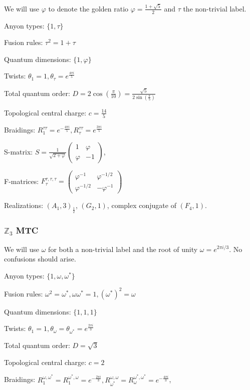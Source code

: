 \documentclass[12pt,psamsfonts]{amsart}
\newcommand{\Z}{\mathbb Z}
\numberwithin{equation}{section}
\theoremstyle{definition}
\begin{document}
We will use $\varphi$ to denote the golden ratio
$\varphi=\frac{1+\sqrt{5}}{2}$ and $\tau$ the non-trivial label.

Anyon types: $\{1,\tau\}$

Fusion rules: $\tau^2=1+\tau$

Quantum dimensions: $\{1,\varphi\}$

Twists: $\theta_1=1, \theta_{\tau}=e^{\frac{4\pi i}{5}}$

Total quantum order:
$D=2\cos(\frac{\pi}{10})=\frac{\sqrt{5}}{2\sin(\frac{\pi}{5})}$

Topological central charge: $c=\frac{14}{5}$

Braidings: $R_1^{\tau \tau}=e^{-\frac{4\pi i}{5}},
R_{\tau}^{\tau\tau}=e^{\frac{3\pi i}{5}}$

S-matrix: $ S=\frac{1}{\sqrt{2+\varphi}} \begin{pmatrix} 1 & \varphi \\
\varphi & -1
\end{pmatrix}$,

F-matrices:  $ F^{\tau,\tau,\tau}_{\tau}=\begin{pmatrix} \varphi^{-1} & {\varphi}^{-1/2} \\
{\varphi}^{-1/2} & -\varphi^{-1}
\end{pmatrix}$

Realizations: $(A_1,3)_{\frac{1}{2}}$, $(G_2,1)$, complex conjugate of $(F_4,1)$.

\subsubsection{$\Z_3$ MTC}  We will use $\omega$ for both a non-trivial label and the
root of unity $\omega=e^{2\pi i/3}$.  No confusions should arise.

Anyon types: $\{1,\omega,\omega^{*}\}$

Fusion rules:
$\omega^2=\omega^*,\omega\omega^*=1,(\omega^*)^2=\omega$

Quantum dimensions: $\{1,1,1\}$

Twists: $\theta_1=1,
\theta_{\omega}=\theta_{\omega^*}=e^{\frac{2\pi i}{3}}$

Total quantum order: $D=\sqrt{3}$

Topological central charge: $c=2$

Braidings:
$R^{\omega,\omega^*}_{1}=R^{\omega^*,\omega}_{1}=e^{-\frac{2\pi
i}{3}},
R^{\omega,\omega}_{\omega^*}=R^{\omega^*,\omega^*}_{\omega}=e^{-\frac{4\pi
i}{3}}$,
\end{document}
